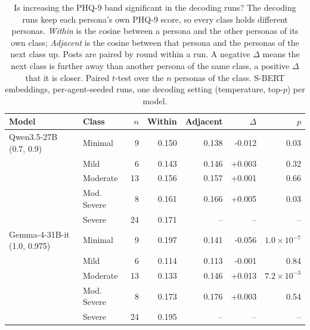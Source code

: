\begin{table}[ht]
\centering
\caption{Is increasing the PHQ-9 band significant in the decoding runs? The decoding runs keep each persona's own PHQ-9 score, so every class holds different personas. \emph{Within} is the cosine between a persona and the other personas of its own class; \emph{Adjacent} is the cosine between that persona and the personas of the next class up. Posts are paired by round within a run. A negative $\Delta$ means the next class is further away than another persona of the same class, a positive $\Delta$ that it is closer. Paired $t$-test over the $n$ personas of the class. S-BERT embeddings, per-agent-seeded runs, one decoding setting (temperature, top-$p$) per model.}
\label{tab:decoding_band_significance}
\begin{tabular}{llrrrrr}
\hline
Model & Class & $n$ & Within & Adjacent & $\Delta$ & $p$ \\
\hline
Qwen3.5-27B (0.7, 0.9) & Minimal & 9 & 0.150 & 0.138 & -0.012 & 0.03 \\
 & Mild & 6 & 0.143 & 0.146 & +0.003 & 0.32 \\
 & Moderate & 13 & 0.156 & 0.157 & +0.001 & 0.66 \\
 & Mod. Severe & 8 & 0.161 & 0.166 & +0.005 & 0.03 \\
 & Severe & 24 & 0.171 & -- & -- & -- \\
\hline
Gemma-4-31B-it (1.0, 0.975) & Minimal & 9 & 0.197 & 0.141 & -0.056 & $1.0\times10^{-7}$ \\
 & Mild & 6 & 0.114 & 0.113 & -0.001 & 0.84 \\
 & Moderate & 13 & 0.133 & 0.146 & +0.013 & $7.2\times10^{-3}$ \\
 & Mod. Severe & 8 & 0.173 & 0.176 & +0.003 & 0.54 \\
 & Severe & 24 & 0.195 & -- & -- & -- \\
\hline
\end{tabular}
\end{table}

